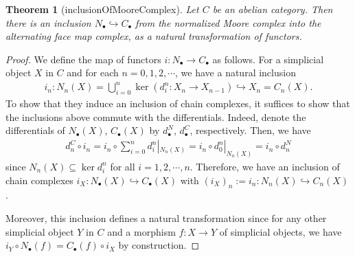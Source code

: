 \documentclass{article}
\newtheorem{theorem}{Theorem}
\begin{document}
\begin{theorem}[inclusionOfMooreComplex]
    Let $C$ be an abelian category. Then there is an inclusion $N_\bullet \hookrightarrow C_\bullet $ from the normalized Moore complex into the alternating face map complex, as a natural transformation of functors.
\end{theorem}
\begin{proof}
    We define the map of functors $i:N_\bullet \to C_\bullet$ as follows. For a simplicial object $X$ in $C$ and for each $n=0,1,2,\cdots$, we have a natural inclusion
    \begin{align*}
        i_n: N_n(X) = \bigcup_{i=0}^n \ker(d_i^n:X_n \to X_{n-1}) \hookrightarrow X_n=C_n(X).
    \end{align*}
    To show that they induce an inclusion of chain complexes, it suffices to show that the inclusions above commute with the differentials. Indeed, denote the differentials of $N_\bullet(X)$, $C_\bullet(X)$ by $d_\bullet^N$, $d_\bullet^C$, respectively. Then, we have
    \begin{align*}
        d_n^C \circ i_n = i_n \circ \sum_{i=0}^n d_i^n|_{N_n(X)} = i_n \circ d_0^n|_{N_n(X)} = i_n \circ d_n^N
    \end{align*}
    since $N_n(X) \subseteq \ker d_i^n$ for all $i=1,2,\cdots,n$. Therefore, we have an inclusion of chain complexes $i_X: N_\bullet(X) \hookrightarrow C_\bullet(X)$ with $(i_X)_n:= i_n:N_n(X) \hookrightarrow C_n(X)$. 

    Moreover, this inclusion defines a natural transformation since for any other simplicial object $Y$ in $C$ and a morphism $f:X \to Y$ of simplicial objects, we have $i_Y \circ N_\bullet(f) = C_\bullet(f) \circ i_X$ by construction.
\end{proof}
\end{document}
